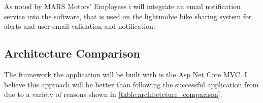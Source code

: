 As noted by MARS Motors' Employees i will integrate an email notification service into the software, that is used on the lightmobie bike sharing system for alerts and user email validation and notification. 

\subsection{Architecture Comparison}



The framework the application will be built with is the Asp Net Core MVC. 
I believe this approach will be better than following the successful application from \citet{MAS_MOTORS} due to a variety of reasons shown in \ref{table:architetcture_comparison}.

